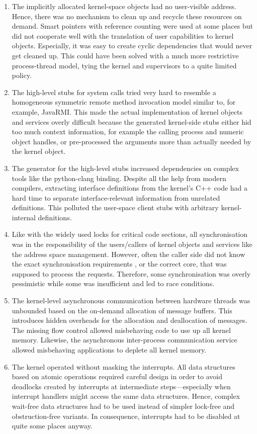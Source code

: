 \begin{enumerate}[(1)]
\item The implicitly allocated kernel-space objects had no user-visible address. Hence, there was no mechanism to clean up and recycle these resources on demand. Smart pointers with reference counting were used at some places but did not cooperate well with the translation of user capabilities to kernel objects. Especially, it was easy to create cyclic dependencies that would never get cleaned up. This could have been solved with a much more restrictive process-thread model, tying the kernel and supervisors to a quite limited policy.
\item The high-level stubs for system calls tried very hard to resemble a homogeneous symmetric remote method invocation model similar to, for example, JavaRMI. This made the actual implementation of kernel objects and services overly difficult because the generated kernel-side stubs either hid too much context information, for example the calling process and numeric object handles, or pre-processed the arguments more than actually needed by the kernel object. 
\item The generator for the high-level stubs increased dependencies on complex tools like the python-clang binding. Despite all the help from modern compilers, extracting interface definitions from the kernel's C++ code had a hard time to separate interface-relevant information from unrelated definitions. This polluted the user-space client stubs with arbitrary kernel-internal definitions. 
\item Like with the widely used locks for critical code sections, all synchronisation was in the responsibility of the users/callers of kernel objects and services like the address space management. However, often the caller side did not know the exact synchronisation requirements , or the correct core, that was supposed to process the requests. Therefore, some synchronisation was overly pessimistic while some was insufficient and led to race conditions.
\item The kernel-level asynchronous communication between hardware threads was unbounded based on the on-demand allocation of message buffers. This introduces hidden overheads for the allocation and deallocation of messages. The missing flow control allowed misbehaving code to use up all kernel memory. Likewise, the asynchronous inter-process communication service allowed misbehaving applications to deplete all kernel memory.
\item The kernel operated without masking the interrupts. All data structures based on atomic operations required careful design in order to avoid deadlocks created by interrupts at intermediate steps---especially when interrupt handlers might access the same data structures. Hence, complex wait-free data structures had to be used instead of simpler lock-free and obstruction-free variants. In consequence, interrupts had to be disabled at quite some places anyway.
\end{enumerate}


